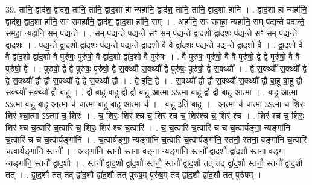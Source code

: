 \documentclass[17pt]{extarticle}
\begin{document}
39. तानि॒ द्वाद॑श॒ द्वाद॑श॒ तानि॒ तानि॒ द्वाद॒शा हा॒ न्यहा॑नि॒ द्वाद॑श॒ तानि॒ तानि॒ द्वाद॒शा हा॑नि । . द्वाद॒शा हा॒ न्यहा॑नि॒ द्वाद॑श॒ द्वाद॒शा हा॑नि॒ सꣳ समहा॑नि॒ द्वाद॑श॒ द्वाद॒शा हा॑नि॒ सम् । . अहा॑नि॒ सꣳ समहा॒ न्यहा॑नि॒ सम् प॑द्यन्ते पद्यन्ते॒ समहा॒ न्यहा॑नि॒ सम् प॑द्यन्ते । . सम् प॑द्यन्ते पद्यन्ते॒ सꣳ सम् प॑द्यन्ते द्वाद॒शो द्वा॑द॒शः प॑द्यन्ते॒ सꣳ सम् प॑द्यन्ते द्वाद॒शः । . प॒द्य॒न्ते॒ द्वा॒द॒शो द्वा॑द॒शः प॑द्यन्ते पद्यन्ते द्वाद॒शो वै वै द्वा॑द॒शः प॑द्यन्ते पद्यन्ते द्वाद॒शो वै । . द्वा॒द॒शो वै वै द्वा॑द॒शो द्वा॑द॒शो वै पुरु॑षः॒ पुरु॑षो॒ वै द्वा॑द॒शो द्वा॑द॒शो वै पुरु॑षः । . वै पुरु॑षः॒ पुरु॑षो॒ वै वै पुरु॑षो॒ द्वे द्वे पुरु॑षो॒ वै वै पुरु॑षो॒ द्वे । . पुरु॑षो॒ द्वे द्वे पुरु॑षः॒ पुरु॑षो॒ द्वे स॒क्थ्यौ॑ स॒क्थ्यौ᳚ द्वे पुरु॑षः॒ पुरु॑षो॒ द्वे स॒क्थ्यौ᳚ । . द्वे स॒क्थ्यौ॑ स॒क्थ्यौ᳚ द्वे द्वे स॒क्थ्यौ᳚ द्वौ द्वौ स॒क्थ्यौ᳚ द्वे द्वे स॒क्थ्यौ᳚ द्वौ । . द्वे इति॒ द्वे । . स॒क्थ्यौ᳚ द्वौ द्वौ स॒क्थ्यौ॑ स॒क्थ्यौ᳚ द्वौ बा॒हू बा॒हू द्वौ स॒क्थ्यौ॑ स॒क्थ्यौ᳚ द्वौ बा॒हू । . द्वौ बा॒हू बा॒हू द्वौ द्वौ बा॒हू आ॒त्मा ऽऽत्मा बा॒हू द्वौ द्वौ बा॒हू आ॒त्मा । . बा॒हू आ॒त्मा ऽऽत्मा बा॒हू बा॒हू आ॒त्मा च॑ चा॒त्मा बा॒हू बा॒हू आ॒त्मा च॑ । . बा॒हू इति॑ बा॒हू । . आ॒त्मा च॑ चा॒त्मा ऽऽत्मा च॒ शिरः॒ शिर॑ श्चा॒त्मा ऽऽत्मा च॒ शिरः॑ । . च॒ शिरः॒ शिर॑ श्च च॒ शिर॑ श्च च॒ शिर॑श्च च॒ शिर॑ श्च । . शिर॑ श्च च॒ शिरः॒ शिर॑ श्च च॒त्वारि॑ च॒त्वारि॑ च॒ शिरः॒ शिर॑ श्च च॒त्वारि॑ । . च॒ च॒त्वारि॑ च॒त्वारि॑ च च च॒त्वार्यङ्गा॒ न्यङ्गा॑नि च॒त्वारि॑ च च च॒त्वार्यङ्गा॑नि । . च॒त्वार्यङ्गा॒ न्यङ्गा॑नि च॒त्वारि॑ च॒त्वार्यङ्गा॑नि॒ स्तनौ॒ स्तना॒ वङ्गा॑नि च॒त्वारि॑ च॒त्वार्यङ्गा॑नि॒ स्तनौ᳚ । . अङ्गा॑नि॒ स्तनौ॒ स्तना॒ वङ्गा॒ न्यङ्गा॑नि॒ स्तनौ᳚ द्वाद॒शौ द्वा॑द॒शौ स्तना॒ वङ्गा॒ न्यङ्गा॑नि॒ स्तनौ᳚ द्वाद॒शौ । . स्तनौ᳚ द्वाद॒शौ द्वा॑द॒शौ स्तनौ॒ स्तनौ᳚ द्वाद॒शौ तत् तद् द्वा॑द॒शौ स्तनौ॒ स्तनौ᳚ द्वाद॒शौ तत् । . द्वा॒द॒शौ तत् तद् द्वा॑द॒शौ द्वा॑द॒शौ तत् पुरु॑ष॒म् पुरु॑ष॒म् तद् द्वा॑द॒शौ द्वा॑द॒शौ तत् पुरु॑षम् । \newline
\pagebreak
{}
\end{document}
